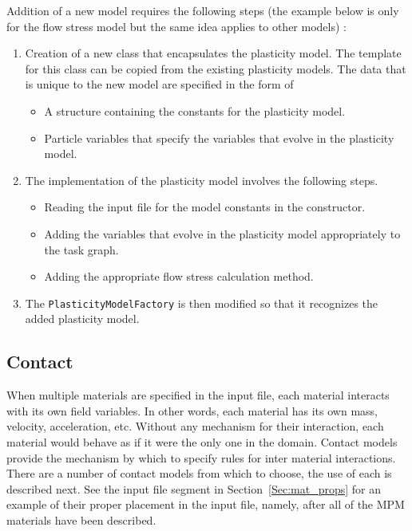 Addition of a new model requires the following steps (the example below is only
for the flow stress model but the same idea applies to other models) :
\begin{enumerate}
    \item Creation of a new class that encapsulates the plasticity
    model.  The template for this class can be copied from the
    existing plasticity models.  The data that is unique to
    the new model are specified in the form of
    \begin{itemize}
      \item A structure containing the constants for the plasticity
            model.
      \item Particle variables that specify the variables that
            evolve in the plasticity model.
    \end{itemize}
    \item The implementation of the plasticity model involves the
    following steps.
    \begin{itemize}
      \item Reading the input file for the model constants in the
            constructor.
      \item Adding the variables that evolve in the plasticity model
            appropriately to the task graph.
      \item Adding the appropriate flow stress calculation method.
    \end{itemize}
    \item The \verb+PlasticityModelFactory+ is then modified so that
          it recognizes the added plasticity model.
\end{enumerate}


\subsection{Contact}  \label{Sec:Contact}

When multiple materials are specified in the input file, each material
interacts with its own field variables.  In other words, each material has
its own mass, velocity, acceleration, etc.  Without any mechanism for their
interaction, each material would behave as if it were the only one in the
domain.  Contact models provide the mechanism by which to specify rules
for inter material interactions.  There are a number of contact models
from which to choose, the use of each is described next.  See the input
file segment in Section~\ref{Sec:mat_props} for an example of their proper
placement in the input file, namely, after all of the MPM materials have
been described.

